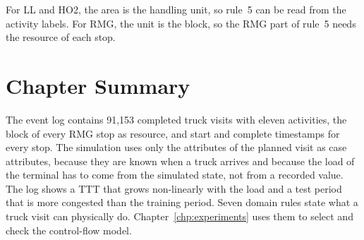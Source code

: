 For LL and HO2, the area is the handling unit, so rule~5 can be read from the
activity labels. For RMG, the unit is the block, so the RMG part of rule~5 needs
the resource of each stop.

\FloatBarrier
\section{Chapter Summary}
\label{sec:cs_summary}

The event log contains 91,153 completed truck visits with eleven activities, the
block of every RMG stop as resource, and start and complete timestamps for every
stop. The simulation uses only the attributes of the planned visit as case
attributes, because they are known when a truck arrives and because the load of
the terminal has to come from the simulated state, not from a recorded value. The
log shows a TTT that grows non-linearly with the load and a test period that is
more congested than the training period. Seven domain rules state what a truck
visit can physically do. Chapter~\ref{chp:experiments} uses them to select and
check the control-flow model.
